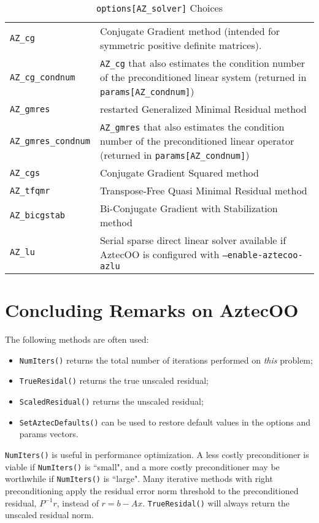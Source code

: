 \begin{table}
\begin{center}
\begin{tabular}{ | p{5cm} | p{10cm} | } \hline
\verb!AZ_cg!         & Conjugate Gradient method (intended for symmetric positive definite matrices). \\
\verb!AZ_cg_condnum! & \verb!AZ_cg! that also estimates the condition number of the preconditioned linear system
                       (returned in \verb!params[AZ_condnum]!)\\ 
\verb!AZ_gmres!      & restarted Generalized Minimal Residual method \\
\verb!AZ_gmres_condnum! & \verb!AZ_gmres! that also estimates the condition number of the preconditioned linear operator
                          (returned in \verb!params[AZ_condnum]!)\\ 
\verb!AZ_cgs! &  Conjugate Gradient Squared method\\
\verb!AZ_tfqmr! & Transpose-Free Quasi Minimal Residual method \\
\verb!AZ_bicgstab! &  Bi-Conjugate Gradient with Stabilization method\\
\verb!AZ_lu! & Serial sparse direct linear solver available if
               AztecOO is configured with {\tt --enable-aztecoo-azlu}\\
\hline \end{tabular}
\caption{ {\tt options[AZ\_solver]} Choices}
\label{tab:aztec:solver}
\end{center}
\end{table}


\section{Concluding Remarks on AztecOO}

The following methods are often used:
\begin{itemize}
\item \verb!NumIters()! returns the total number of iterations performed
  on {\sl this} problem;
\item \verb!TrueResidal()! returns the true unscaled residual;
\item \verb!ScaledResidual()! returns the unscaled residual;
\item \verb!SetAztecDefaults()! can be used to restore default values in
  the options and params vectors.
\end{itemize}
\verb!NumIters()! is useful in performance optimization.
A less costly preconditioner is viable if \verb!NumIters()! is ``small", 
and a more costly preconditioner may be worthwhile if \verb!NumIters()! is ``large".
Many iterative methods with right preconditioning 
apply the residual error norm threshold to the preconditioned residual,
$P^{-1}r$, instead of $r=b-Ax$.
\verb!TrueResidal()! will always return the unscaled residual norm.
